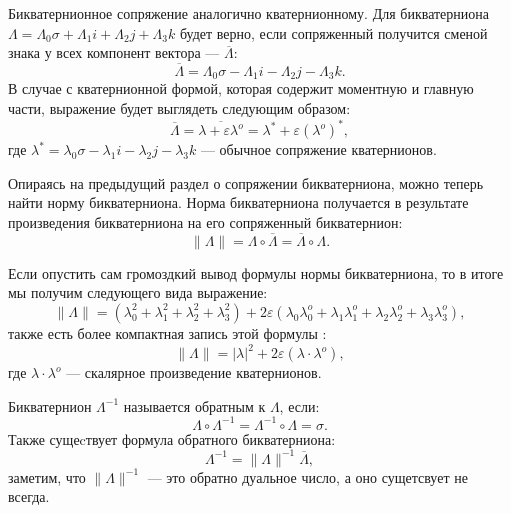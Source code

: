 Бикватернионное сопряжение аналогично кватернионному. Для бикватерниона $\Lambda = \Lambda_0 \sigma + \Lambda_1 i + \Lambda_2 j + \Lambda_3 k$ будет верно, если сопряженный получится сменой знака у всех компонент вектора --- $\overline{\Lambda}$:
\begin{equation*}
    \overline{\Lambda} = \Lambda_0 \sigma - \Lambda_1 i - \Lambda_2 j - \Lambda_3 k.
\end{equation*}
В случае с кватернионной формой, которая содержит моментную и главную части, выражение будет выглядеть следующим образом:
\begin{equation*}
    \overline{\Lambda} = \overline{\lambda + \varepsilon \lambda^o} = \lambda^* + \varepsilon (\lambda^o)^*,
\end{equation*}
где $\lambda^* = \lambda_0 \sigma - \lambda_1 i - \lambda_2 j - \lambda_3 k$ --- обычное сопряжение кватернионов.

Опираясь на предыдущий раздел о сопряжении бикватерниона, можно теперь найти норму бикватерниона. Норма бикватерниона получается в результате произведения бикватерниона на его сопряженный бикватернион:
\begin{equation*}
    \|\Lambda\| = \Lambda \circ \overline{\Lambda} = \overline{\Lambda} \circ \Lambda.
\end{equation*}

Если опустить сам громоздкий вывод формулы нормы бикватерниона, то в итоге мы получим следующего вида выражение:
\begin{equation*}
    \|\Lambda\| = (\lambda_0^2 + \lambda_1^2 + \lambda_2^2 + \lambda_3^2) + 2\varepsilon (\lambda_0 \lambda_0^o + \lambda_1 \lambda_1^o + \lambda_2 \lambda_2^o + \lambda_3 \lambda_3^o),
\end{equation*}
также есть более компактная запись этой формулы :
\begin{equation*}
    \|\Lambda\| = |\lambda|^2 + 2\varepsilon (\lambda \cdot \lambda^o),
\end{equation*}
где $\lambda \cdot \lambda^o$ --- скалярное произведение кватернионов.

Бикватернион $\Lambda^{-1}$ называется обратным к $\Lambda$, если:
\begin{equation*}
    \Lambda \circ \Lambda^{-1} = \Lambda^{-1} \circ \Lambda = \sigma.
\end{equation*}
Также сущеcтвует формула обратного бикватерниона:
\begin{equation*}
    \Lambda^{-1} = \|\Lambda\|^{-1} \overline{\Lambda},
\end{equation*}
заметим, что $\|\Lambda\|^{-1}$ --- это обратно дуальное число, а оно сущетсвует не всегда.

